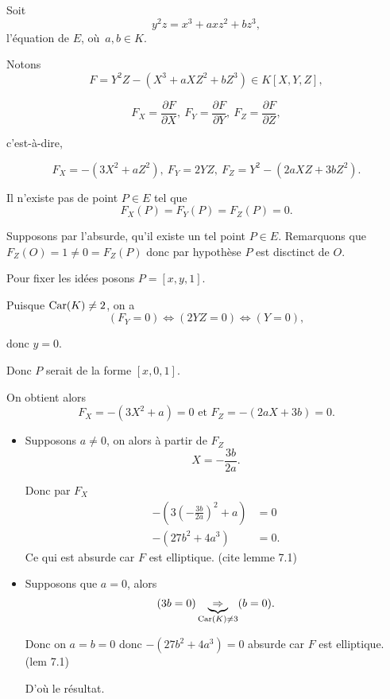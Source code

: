 
Soit 
\[
y^2z = x^3 + axz^2 + bz^3
,\] l'équation de $E$, où $a,b \in K$.

Notons
\[
    F = Y^2Z - \left( X^3 + aXZ^2 + bZ^3 \right) \in K[X,Y,Z]
,\] 

\[
F_{X} = \frac{\partial F}{\partial X}, \ F_{Y} = \frac{\partial F}{\partial Y}, \ F_{Z} = \frac{\partial F}{\partial Z}
,\] 

c'est-à-dire, 

\[
F_{X} = - \left( 3X^2 + aZ^2 \right),  \ F_{Y} = 2YZ, \ F_{Z} = Y^2 - \left( 2aXZ + 3bZ^2 \right)
.\] 

\begin{lemme}
    Il n'existe pas de point $P \in E$ tel que
    \[
    F_{X}(P) = F_{Y}(P) = F_{Z}(P) = 0
    .\] 
\end{lemme}

\begin{demonstration}
   Supposons par l'absurde, qu'il existe un tel point $P \in E$. Remarquons que $F_{Z}(O) = 1 \neq 0 = F_{Z}(P)$ donc par hypothèse $P$ est disctinct de $O$.

   Pour fixer les idées posons $P = [x,y,1]$.

   Puisque $\operatorname{Car}(K) \neq 2$, on a
   \[
       (F_{Y} = 0) \iff (2YZ = 0) \iff (Y = 0) 
   ,\] 

   donc $y = 0$.
   
   Donc $P$ serait de la forme $[x,0,1]$.
   
   On obtient alors
   \[
   F_{X} = - \left( 3X^2 + a \right) = 0 \text{ et } F_{Z} = -\left( 2aX + 3b \right) = 0
   .\] 
   
   \begin{itemize}
       \item Supposons $a \neq 0$, on alors à partir de $F_{Z}$
   \[
       X = - \frac{3b}{2a} 
   .\] 

   Donc par $F_{X}$
\begin{align*}
    - \left( 3 (- \frac{3b}{2a})^2 + a \right) &= 0 \\
    - \left( 27b^2 + 4a^3 \right) &= 0
.\end{align*}
Ce qui est absurde car $F$ est elliptique. (cite lemme 7.1)
        \item Supposons que $a = 0$, alors
            \[
                (3b = 0) \underbrace{\Rightarrow}_{\operatorname{Car}(K) \neq 3} (b = 0)
            .\] 

            Donc on $a = b = 0$ donc $-\left( 27b^2 + 4a^3 \right) = 0$ absurde car $F$ est elliptique. (lem 7.1)

            D'où le résultat.
   \end{itemize}
\end{demonstration}

